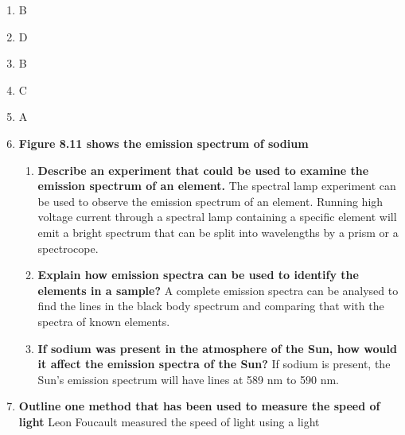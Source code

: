 \documentclass{report}
\begin{document}
		\begin{enumerate}
			\item B
			\item D
			\item B
			\item C
			\item A
			\item \textbf{Figure 8.11 shows the emission spectrum of sodium}
				\begin{enumerate}
					\item \textbf{Describe an experiment that could be used to examine the emission spectrum of an element.}
						\subitem The spectral lamp experiment can be used to observe the emission spectrum of an element. Running high voltage current through a spectral lamp containing a specific element will emit a bright spectrum that can be split into wavelengths by a prism or a spectrocope.

					\item \textbf{Explain how emission spectra can be used to identify the elements in a sample?}
						\subitem A complete emission spectra can be analysed to find the lines in the black body spectrum and comparing that with the spectra of known elements.

					\item \textbf{If sodium was present in the atmosphere of the Sun, how would it affect the emission spectra of the Sun?}
						\subitem If sodium is present, the Sun's emission spectrum will have lines at 589 nm to 590 nm.
				\end{enumerate}

			\item \textbf{Outline one method that has been used to measure the speed of light}
				\subitem Leon Foucault measured the speed of light using a light
		\end{enumerate}
\end{document}

